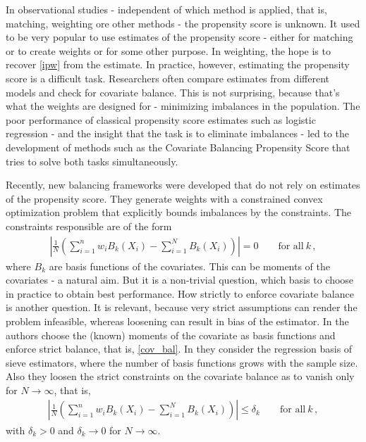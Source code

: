 In observational studies - independent of which method is applied, that is, matching, weighting ore other methods -
the propensity score is unknown.
It used to be very popular to use estimates of the propensity score - either for matching or to create weights or for some other purpose.
In weighting, the hope is to recover \eqref{ipw} from the estimate.
In practice, however, estimating the propensity score is a difficult task.
Researchers often compare estimates from different models and check for covariate balance. 
This is not surprising, because that's what the weights are designed for - minimizing imbalances in the population.
The poor performance of classical propensity score estimates such as logistic regression - and the insight that the task is to eliminate imbalances -
led to the development of methods such as the Covariate Balancing Propensity Score \cite{Imai2014a} that tries to solve both tasks simultaneously.

Recently, new balancing frameworks were developed that do not rely on estimates of the propensity score\cite{Hainmueller2012,Zubizarreta2015}.
They generate weights with a constrained convex optimization problem that explicitly bounds imbalances by the constraints. 
The constraints responsible are of the form
\begin{gather}
  \label{cov_bal}
  \left| 
  \frac{1}{N}
  \left( 
    \sum_{i=1}^{n}
    w_i
    B_k(X_i)
    -
    \sum_{i=1}^{N} 
    B_k(X_i)
  \right)
  \right|
  =
  0
  \qquad
  \text{for all}\ 
  k\,,
\end{gather}
where $B_k$ are basis functions of the covariates. This can be moments of the covariates - a natural aim. 
But it is a non-trivial question, which basis to choose in practice to obtain best performance.
How strictly to enforce covariate balance is another question.
It is relevant, because very strict assumptions can render the problem infeasible, whereas loosening can result in bias of the estimator.
In \cite{Hainmueller2012} the authors choose the (known) moments of the covariate as basis functions and enforce strict balance, that is, \eqref{cov_bal}.
In \cite{Wang2019} they consider the regression basis of sieve estimators\cite{Newey1997a}, where the number of basis functions grows with the sample size.
Also they loosen the strict constraints on the covariate balance as to vanish only for $N\to\infty$, that is,
\begin{gather}
  \label{cov_bal}
  \left| 
  \frac{1}{N}
  \left( 
    \sum_{i=1}^{n}
    w_i
    B_k(X_i)
    -
    \sum_{i=1}^{N} 
    B_k(X_i)
  \right)
  \right|
  \le
  \delta_k
  \qquad
  \text{for all}\ 
  k\,,
\end{gather}
with $\delta_k > 0 $ and $\delta_k\to 0$ for $N\to\infty$.

